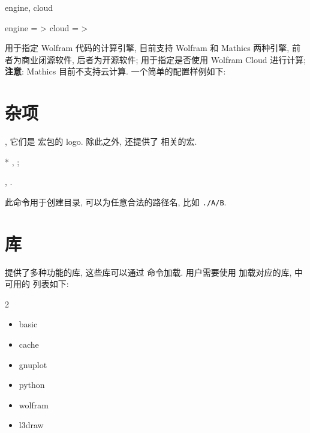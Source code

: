 \documentclass[
  hyper, 
  lang = cn, 
  class = l3doc,
  classOption={11pt},
  sect = {load=false},
]{../../zlatex/code/ztex}
\begin{document}
\begin{keyval}[added=2025-05-18, parent=ztikz/wolfram]{engine, cloud}
  \begin{syntax}
    engine = >
    cloud  = >
  \end{syntax}
   用于指定 Wolfram 代码的计算引擎, 目前支持 Wolfram 和 Mathics 两种引擎,
  前者为商业闭源软件, 后者为开源软件;  用于指定是否使用 Wolfram Cloud 进行计算;
  \textbf{注意}: Mathics 目前不支持云计算. 一个简单的配置样例如下:
\end{keyval}
\begin{DocExample}
\usepackage[
  library = { wolfram },
  wolfram = { engine=wolfram, cloud=true }
]{ztikz}
\end{DocExample}


\clearpage
\section{杂项}
\begin{function}[added=2025-09-22]{\zTikZ, \ztikz}
  它们是  宏包的 logo. 除此之外,  还提供了 
  相关的宏. 
\end{function}
\begin{DocExample}*
\zTikZ, \ztikz;\par
{}, .
\end{DocExample}


\begin{function}[added=2025-05-15]{\ztikzMkdir}
  \begin{syntax}
  \end{syntax}
  此命令用于创建目录,  可以为任意合法的路径名, 比如 \texttt{./A/B}. 
\end{function}



\clearpage
\section{\texorpdfstring{\textcolor{black}{\ztikz}}{zTikZ} 库}
\ztikz{} 提供了多种功能的库, 这些库可以通过  命令加载. 用户需要使用 \texttt{}
加载对应的库, \ztikz{} 中可用的  列表如下:
\begin{multicols}{2}
  \begin{itemize}
    \item basic 
    \item cache
    \item gnuplot
    \item python
    \item wolfram
    \item l3draw
  \end{itemize}
\end{multicols}
\end{document}
